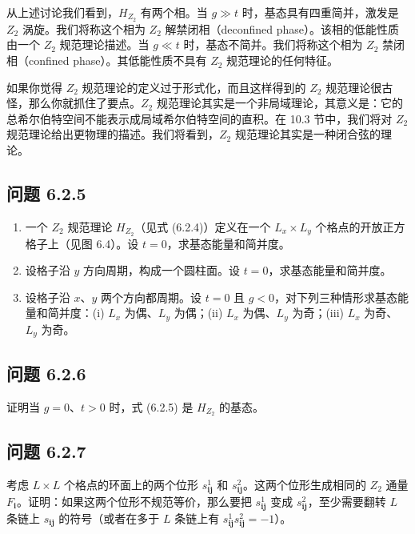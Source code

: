 从上述讨论我们看到，$H_{Z_2}$ 有两个相。当 $g \gg t$ 时，基态具有四重简并，激发是 $Z_2$ 涡旋。我们将称这个相为 $Z_2$ 解禁闭相（deconfined phase）。该相的低能性质由一个 $Z_2$ 规范理论描述。当 $g \ll t$ 时，基态不简并。我们将称这个相为 $Z_2$ 禁闭相（confined phase）。其低能性质不具有 $Z_2$ 规范理论的任何特征。

如果你觉得 $Z_2$ 规范理论的定义过于形式化，而且这样得到的 $Z_2$ 规范理论很古怪，那么你就抓住了要点。$Z_2$ 规范理论其实是一个非局域理论，其意义是：它的总希尔伯特空间不能表示成局域希尔伯特空间的直积。在 10.3 节中，我们将对 $Z_2$ 规范理论给出更物理的描述。我们将看到，$Z_2$ 规范理论其实是一种闭合弦的理论。


\subsection*{问题 6.2.5}

\begin{enumerate}
\item[(a)] 一个 $Z_2$ 规范理论 $H_{Z_2}$（见式 (6.2.4)）定义在一个 $L_x \times L_y$ 个格点的开放正方格子上（见图 6.4）。设 $t = 0$，求基态能量和简并度。
\item[(b)] 设格子沿 $y$ 方向周期，构成一个圆柱面。设 $t = 0$，求基态能量和简并度。
\item[(c)] 设格子沿 $x$、$y$ 两个方向都周期。设 $t = 0$ 且 $g < 0$，对下列三种情形求基态能量和简并度：(i) $L_x$ 为偶、$L_y$ 为偶；(ii) $L_x$ 为偶、$L_y$ 为奇；(iii) $L_x$ 为奇、$L_y$ 为奇。
\end{enumerate}

\subsection*{问题 6.2.6}

证明当 $g = 0$、$t > 0$ 时，式 (6.2.5) 是 $H_{Z_2}$ 的基态。

\subsection*{问题 6.2.7}

考虑 $L \times L$ 个格点的环面上的两个位形 $s^1_{\pmb{ij}}$ 和 $s^2_{\pmb{ij}}$。这两个位形生成相同的 $Z_2$ 通量 $F_{\pmb{i}}$。证明：如果这两个位形不规范等价，那么要把 $s^1_{\pmb{ij}}$ 变成 $s^2_{\pmb{ij}}$，至少需要翻转 $L$ 条链上 $s_{\pmb{ij}}$ 的符号（或者在多于 $L$ 条链上有 $s^1_{\pmb{ij}} s^2_{\pmb{ij}} = -1$）。

